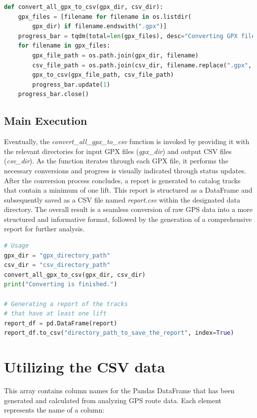 \begin{lstlisting}[language=Python]
def convert_all_gpx_to_csv(gpx_dir, csv_dir):
    gpx_files = [filename for filename in os.listdir(
        gpx_dir) if filename.endswith(".gpx")]
    progress_bar = tqdm(total=len(gpx_files), desc="Converting GPX files")
    for filename in gpx_files:
        gpx_file_path = os.path.join(gpx_dir, filename)
        csv_file_path = os.path.join(csv_dir, filename.replace(".gpx", ".csv"))
        gpx_to_csv(gpx_file_path, csv_file_path)
        progress_bar.update(1)
    progress_bar.close()
\end{lstlisting}

\subsection{Main Execution}
\label{sec:data:main}

Eventually, the \textit{convert\_all\_gpx\_to\_csv} function is invoked by providing it with the relevant directories for input GPX files (\textit{gpx\_dir}) and output CSV files (\textit{csv\_dir}). 
As the function iterates through each GPX file, it performs the necessary conversions and progress is visually indicated through status updates. After the conversion process concludes, 
a report is generated to catalog tracks that contain a minimum of one lift. This report is structured as a DataFrame and subsequently saved as a CSV file named 
\textit{report.csv} within the designated data directory. The overall result is a seamless conversion of raw 
GPS data into a more structured and informative format, followed by the generation of a comprehensive report for further analysis.

\begin{lstlisting}[language=Python]
# Usage
gpx_dir = "gpx_directory_path"
csv_dir = "csv_directory_path"
convert_all_gpx_to_csv(gpx_dir, csv_dir)
print("Converting is finished.")

# Generating a report of the tracks 
# that have at least one lift
report_df = pd.DataFrame(report)
report_df.to_csv("directory_path_to_save_the_report", index=True)
\end{lstlisting}


\section{Utilizing the CSV data}
\label{sec:data-csv}

This array contains column names for the Pandas DataFrame that has been generated and calculated from analyzing GPS route data. Each element represents the name of a column:

